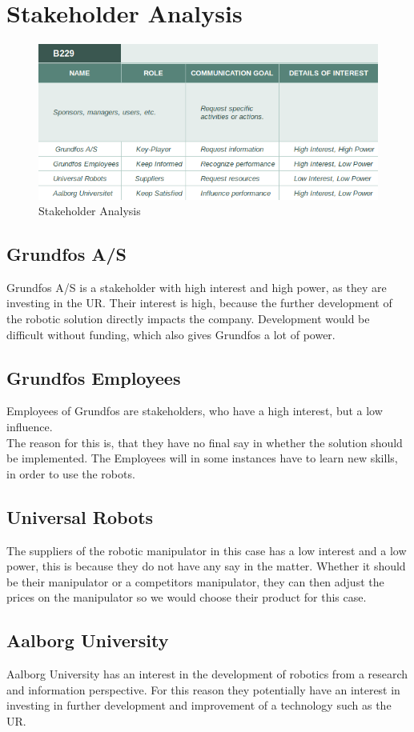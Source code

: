 \chapter{Stakeholder Analysis} \label{ch:Stakeholder Analysis}

\begin{figure}[h]
    \centering
    \includegraphics[scale=0.65]{StakeholderAnalysis/Stakeholder.png}
    \caption{Stakeholder Analysis} 
    \label{fig:Stakeholder} 
\end{figure}

\section{Grundfos A/S}\label{ch:grundfosas-stake}
Grundfos A/S is a stakeholder with high interest and high power, as they are investing in the UR. Their interest is high, because the further development of the robotic solution directly impacts the company. Development would be difficult without funding, which also gives Grundfos a lot of power. 


\section{Grundfos Employees}\label{ch:grundfosemp-stake}
Employees of Grundfos are stakeholders, who have a high interest, but a low influence.\\ The reason for this is, that they have no final say in whether the solution should be implemented. The Employees will in some instances have to learn new skills, in order to use the robots.


\section{Universal Robots}\label{ch:Universalrobots-stake}
The suppliers of the robotic manipulator in this case has a low interest and a low power, this is because they do not have any say in the matter. Whether it should be their manipulator or a competitors manipulator, they can then adjust the prices on the manipulator so we would choose their product for this case. 


\section{Aalborg University}\label{ch:Aau-stake}
Aalborg University has an interest in the development of robotics from a research and information perspective. For this reason they potentially have an interest in investing in further development and improvement of a technology such as the UR. 